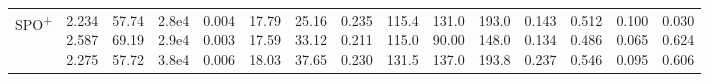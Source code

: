 \begin{landscape}
\begin{table}[t]
{\begin{tabular}{@{}lrrrrrrrrrrrrrr@{}}
SPO\textsuperscript{+} & \makecell[r]{2.234\\2.587\\2.275} & \makecell[r]{57.74\\69.19\\57.72} & \makecell[r]{2.8e4\\2.9e4\\3.8e4} & \makecell[r]{0.004\\0.003\\0.006} & \makecell[r]{17.79\\17.59\\18.03} & \makecell[r]{25.16\\33.12\\37.65} & \makecell[r]{0.235\\0.211\\0.230} & \makecell[r]{115.4\\115.0\\131.5} & \makecell[r]{131.0\\90.00\\137.0} & \makecell[r]{193.0\\148.0\\193.8} & \makecell[r]{0.143\\0.134\\0.237} & \makecell[r]{0.512\\0.486\\0.546} & \makecell[r]{0.100\\0.065\\0.095} & \makecell[r]{0.030\\0.624\\0.606} \\

\end{tabular}}
\end{table}
\end{landscape}
